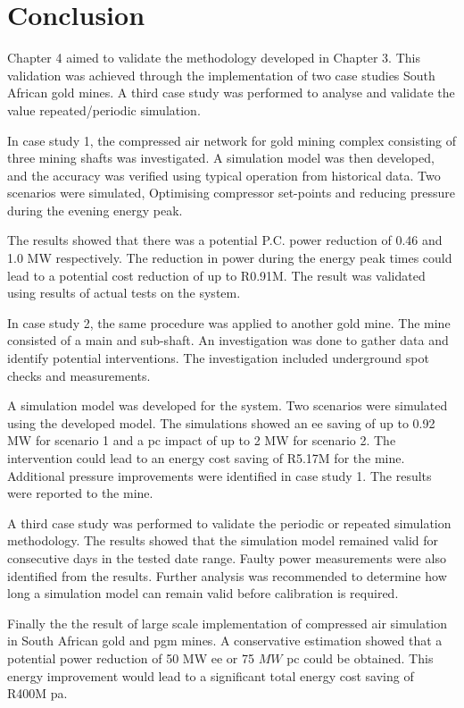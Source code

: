 \section{Conclusion}
Chapter 4 aimed to validate the methodology developed in Chapter 3. This validation was achieved through the implementation of two case studies South African gold mines. A third case study was performed to analyse and validate the value repeated/periodic simulation.
\par 
In case study 1, the compressed air network for gold mining complex consisting of three mining shafts was investigated. A simulation model was then developed, and the accuracy was verified using typical operation from historical data. Two scenarios were simulated, Optimising compressor set-points and reducing pressure during the evening energy peak.
\par 
The results showed that there was a potential P.C. power reduction of 0.46 and 1.0 MW respectively. The reduction in power during the energy peak times could lead to a potential cost reduction of up to R0.91M. The result was validated using results of actual tests on the system.
\par
In case study 2, the same procedure was applied to another gold mine.  The mine consisted of a main and sub-shaft. An investigation was done to gather data and identify potential interventions. The investigation included underground spot checks and measurements.
\par 
A simulation model was developed for the system. Two scenarios were simulated using the developed model. The simulations showed an \gls{ee} saving of up to 0.92 MW for scenario 1 and a \gls{pc} impact of up to 2 MW for scenario 2. The intervention could lead to an energy cost saving of R5.17M for the mine. Additional pressure improvements were identified in case study 1. The results were reported to the mine.
\par
A third case study was performed to validate the periodic or repeated simulation methodology. The results showed that the simulation model remained valid for consecutive days in the tested date range. Faulty power measurements were also identified from the results. Further analysis was recommended to determine how long a simulation model can remain valid before calibration is required.
\par 
Finally the the result of large scale implementation of compressed air simulation in South African gold and \gls{pgm} mines. A conservative estimation showed that a potential power reduction of 50 MW \gls{ee} or 75 $ MW $ \gls{pc} could be obtained. This energy improvement would lead to a significant total energy cost saving of R400M \gls{pa}.
